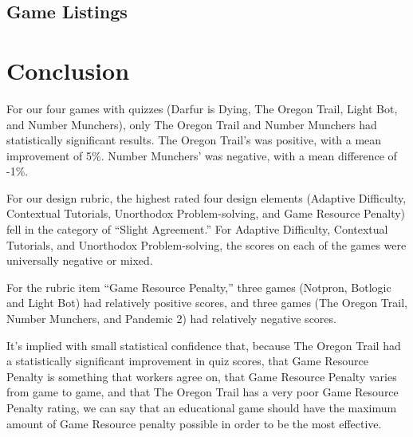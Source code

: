 \documentclass[12pt]{report}
\begin{document}
	\section{Game Listings}








	


\chapter{Conclusion}
	For our four games with quizzes (Darfur is Dying, The Oregon Trail, Light Bot, and Number Munchers), only The Oregon Trail and Number Munchers had statistically significant results. The Oregon Trail's was positive, with a mean improvement of 5\%. Number Munchers' was negative, with a mean difference of -1\%.

	For our design rubric, the highest rated four design elements (Adaptive Difficulty, Contextual Tutorials, Unorthodox Problem-solving, and Game Resource Penalty) fell in the category of ``Slight Agreement.'' For Adaptive Difficulty, Contextual Tutorials, and Unorthodox Problem-solving, the scores on each of the games were universally negative or mixed.

	For the rubric item ``Game Resource Penalty,'' three games (Notpron, Botlogic and Light Bot) had relatively positive scores, and three games (The Oregon Trail, Number Munchers, and Pandemic 2) had relatively negative scores.

	It's implied with small statistical confidence that, because The Oregon Trail had a statistically significant improvement in quiz scores, that Game Resource Penalty is something that workers agree on, that Game Resource Penalty varies from game to game, and that The Oregon Trail has a very poor Game Resource Penalty rating, we can say that an educational game should have the maximum amount of Game Resource penalty possible in order to be the most effective.
\end{document}
